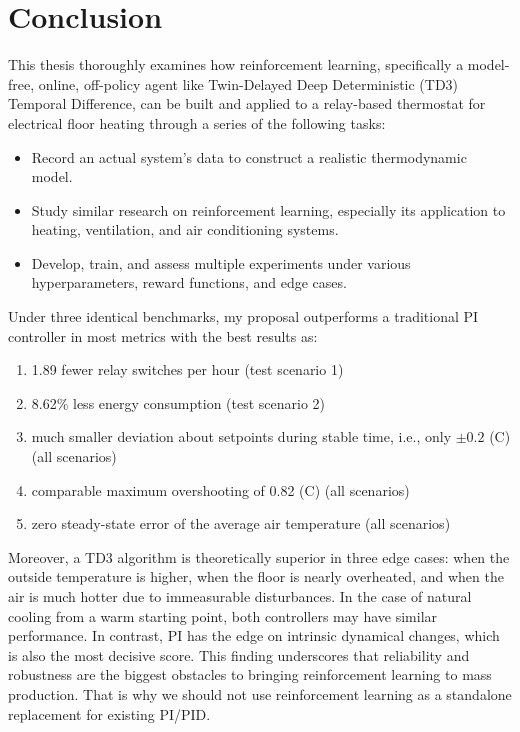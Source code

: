\documentclass[../main.tex]{subfiles}
\begin{document}
\section{Conclusion}
This thesis thoroughly examines how reinforcement learning, specifically a model-free, online, off-policy agent like Twin-Delayed Deep Deterministic (TD3) Temporal Difference, can be built and applied to a relay-based thermostat for electrical floor heating through a series of the following tasks:
\begin{itemize}
    \item Record an actual system's data to construct a realistic thermodynamic model.
    \item Study similar research on reinforcement learning, especially its application to heating, ventilation, and air conditioning systems.
    \item Develop, train, and assess multiple experiments under various hyperparameters, reward functions, and edge cases.
\end{itemize}
Under three identical benchmarks, my proposal outperforms a traditional PI controller in most metrics with the best results as:
\begin{enumerate}
    \item 1.89 fewer relay switches per hour (test scenario 1)
    \item 8.62\% less energy consumption (test scenario 2)
    \item much smaller deviation about setpoints during stable time, i.e., only $\pm 0.2$ (\degree C) (all scenarios)
    \item comparable maximum overshooting of 0.82 (\degree C) (all scenarios)
    \item zero steady-state error of the average air temperature (all scenarios)
\end{enumerate}
Moreover, a TD3 algorithm is theoretically superior in three edge cases: when the outside temperature is higher, when the floor is nearly overheated, and when the air is much hotter due to immeasurable disturbances. In the case of natural cooling from a warm starting point, both controllers may have similar performance. In contrast, PI has the edge on intrinsic dynamical changes, which is also the most decisive score. This finding underscores that reliability and robustness are the biggest obstacles to bringing reinforcement learning to mass production. That is why we should not use reinforcement learning as a standalone replacement for existing PI/PID.
\end{document}
